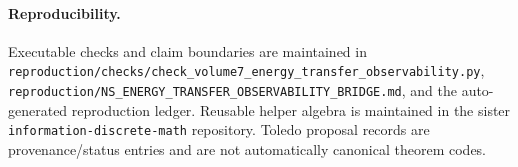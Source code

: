 \documentclass[11pt]{article}
\theoremstyle{definition}
\begin{document}
\paragraph{Reproducibility.}
Executable checks and claim boundaries are maintained in
\texttt{reproduction/checks/check\_volume7\_energy\_transfer\_observability.py},
\texttt{reproduction/NS\_ENERGY\_TRANSFER\_OBSERVABILITY\_BRIDGE.md}, and the auto-generated
reproduction ledger.  Reusable helper algebra is maintained in the sister
\texttt{information-discrete-math} repository.  Toledo proposal records are provenance/status
entries and are not automatically canonical theorem codes.
\end{document}
